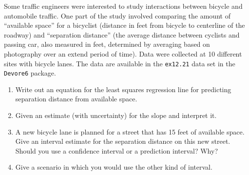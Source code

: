 \documentclass[twoside]{book}\usepackage[]{graphicx}\usepackage[]{xcolor}
\newcommand{\Rindex}[1]{\index{\texttt{#1}}}
\newcommand{\dataframe}[1]{{\color{blue!80!black}\texttt{#1}}\Rindex{#1}}
\newcommand{\pkg}[1]{{\color{red!80!black}\texttt{#1}}\Rindex{#1}}
\begin{document}
\begin{problem}
	Some traffic engineers were interested to study interactions between bicycle and 
	automobile traffic.  One part of the study involved comparing the amount of 
	``available space'' for a bicyclist 
	(distance in feet from bicycle to centerline of the roadway) and 
	``separation distance'' 
	(the average distance between cyclists and passing car, also measured in feet, 
	determined by averaging based on photography over an extend period of time).
	Data were collected at 10 different sites with bicycle lanes.
	The data are available in the \dataframe{ex12.21} data set in 
	the \pkg{Devore6} package.

	\begin{enumerate}
		\item Write out an equation for the least squares regression line for 
			predicting separation distance from available space.
		\item Given an estimate (with uncertainty) for the slope and interpret it.
		\item A new bicycle lane is planned for a street that has 15 feet of available
			space.  Give an interval estimate for the separation distance 
			on this new street.  Should you use a confidence interval or a prediction
			interval?  Why?
		\item
			Give a scenario in which you would use the other kind of interval.
	\end{enumerate}
\end{problem}
\end{document}
